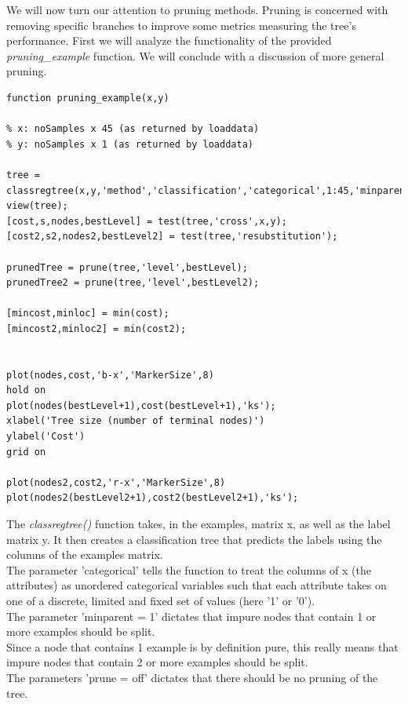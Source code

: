 We will now turn our attention to pruning methods. Pruning is concerned with removing specific branches to improve some metrics measuring
the tree's performance. First we will analyze the functionality of the provided \emph{pruning\_example} function.
We will conclude with a discussion of more general pruning.



\lstset{language=matlab}

\begin{lstlisting}
function pruning_example(x,y)
    
% x: noSamples x 45 (as returned by loaddata)
% y: noSamples x 1 (as returned by loaddata)

tree = classregtree(x,y,'method','classification','categorical',1:45,'minparent',1,'prune','off');
view(tree);
[cost,s,nodes,bestLevel] = test(tree,'cross',x,y);
[cost2,s2,nodes2,bestLevel2] = test(tree,'resubstitution');

prunedTree = prune(tree,'level',bestLevel);
prunedTree2 = prune(tree,'level',bestLevel2);

[mincost,minloc] = min(cost);
[mincost2,minloc2] = min(cost2);


plot(nodes,cost,'b-x','MarkerSize',8)
hold on
plot(nodes(bestLevel+1),cost(bestLevel+1),'ks');
xlabel('Tree size (number of terminal nodes)')
ylabel('Cost')
grid on

plot(nodes2,cost2,'r-x','MarkerSize',8)
plot(nodes2(bestLevel2+1),cost2(bestLevel2+1),'ks');
\end{lstlisting}




The \emph{classregtree()} function takes, in the examples, matrix x, as well as the label matrix y.
It then creates a classification tree that predicts the labels using the columns of the examples matrix.\\
The parameter 'categorical' tells the function to treat the columns of x (the attributes) as unordered categorical variables
such that each attribute takes on one of a discrete, limited and fixed set of values (here '1' or '0').\\
The parameter 'minparent = 1' dictates that impure nodes that contain 1 or more examples should be split.\\
Since a node that contains 1 example is by definition pure,
this really means that impure nodes that contain 2 or more examples should be split.\\
The parameters 'prune = off' dictates that there should be no pruning of the tree.

